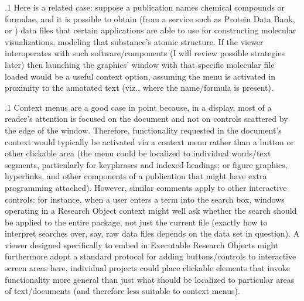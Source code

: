 \documentclass[11pt, twocolumn]{article}
\begin{document}
\p.1{%
Here is a related case: suppose a publication names
chemical compounds or formulae, and it is possible
to obtain (from a service such as Protein Data Bank, or
) data files that certain applications are able to use
for constructing \ThreeD{} molecular visualizations, modeling
that substance's atomic structure. If the  viewer
interoperates with such software/components
(I will review possible strategies later) then
launching the graphics' window with that
specific molecular file loaded would be a useful
context option, assuming the menu is
activated in proximity to the annotated text
(viz., where the name/formula is present).
}%

\p.1{%
Context menus are a good case in point because, in a  display,
most of a reader's attention is focused on the document and not
on  controls scattered by the edge of the window. Therefore,
functionality requested in the document's context would
typically be activated via a context menu rather than a
 button or other clickable area (the menu could be
localized to individual words/text segments, particularly
for keyphrases and indexed headings; or figure graphics,
hyperlinks, and other components of a publication that
might have extra programming attached). However,
similar comments apply to other interactive controls: for
instance, when a user enters a term into the  search
box, windows operating in a Research Object context might
well ask whether the search should be applied to
the entire package, not just the current  file
(exactly how to interpret searches over, say, raw
data files depends on the data set in question). A
 viewer designed specifically to embed
in Executable Research Objects might furthermore adopt
a standard protocol for adding  buttons/controls
to interactive screen areas \mdash{} here, individual projects
could place clickable elements that invoke functionality
more general than just what should be localized to
particular areas of text/documents (and therefore
less suitable to context menus).
}%
\end{document}
